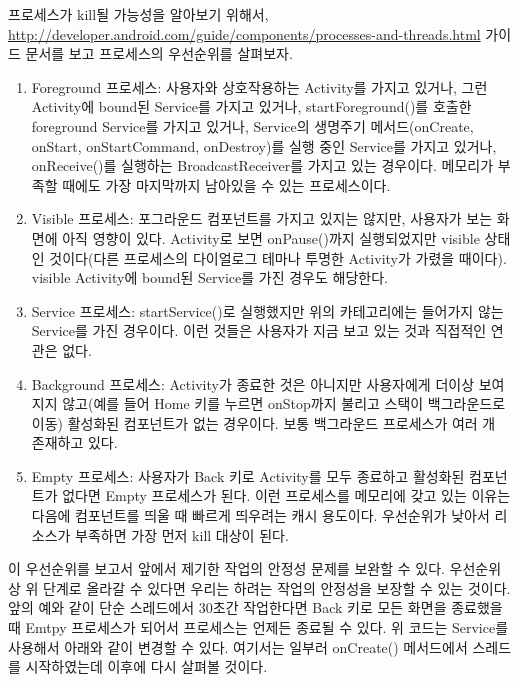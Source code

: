 프로세스가 kill될 가능성을 알아보기 위해서, 
\url{http://developer.android.com/guide/components/processes-and-threads.html} 가이드 문서를 보고 프로세스의 우선순위를 살펴보자.
\begin{enumerate}
\item Foreground 프로세스: 사용자와 상호작용하는 Activity를 가지고 있거나, 그런 Activity에 bound된 Service를 가지고 있거나, startForeground()를 호출한 foreground Service를 가지고 있거나, Service의 생명주기 메서드(onCreate, onStart, onStartCommand, onDestroy)를 실행 중인 Service를 가지고 있거나, onReceive()를 실행하는 BroadcastReceiver를 가지고 있는 경우이다.
메모리가 부족할 때에도 가장 마지막까지 남아있을 수 있는 프로세스이다.

\item Visible 프로세스: 포그라운드 컴포넌트를 가지고 있지는 않지만, 사용자가 보는 화면에 아직 영향이 있다. Activity로 보면 onPause()까지 실행되었지만 visible 상태인 것이다(다른 프로세스의 다이얼로그 테마나 투명한 Activity가 가렸을 때이다).
visible Activity에 bound된 Service를 가진 경우도 해당한다. 

\item Service 프로세스: startService()로 실행했지만 위의 카테고리에는 들어가지 않는 Service를 가진 경우이다. 이런 것들은 사용자가 지금 보고 있는 것과 직접적인 연관은 없다.

\item Background 프로세스: Activity가 종료한 것은 아니지만 사용자에게 더이상 보여지지 않고(예를 들어 Home 키를 누르면 onStop까지 불리고 스택이 백그라운드로 이동) 활성화된 컴포넌트가 없는 경우이다. 보통 백그라운드 프로세스가 여러 개 존재하고 있다.

\item Empty 프로세스: 사용자가 Back 키로 Activity를 모두 종료하고 활성화된 컴포넌트가 없다면 Empty 프로세스가 된다. 이런 프로세스를 메모리에 갖고 있는 이유는 다음에 컴포넌트를 띄울 때 빠르게 띄우려는 캐시 용도이다. 우선순위가 낮아서 리소스가 부족하면 가장 먼저 kill 대상이 된다.
\end{enumerate}

이 우선순위를 보고서 앞에서 제기한 작업의 안정성 문제를 보완할 수 있다. 우선순위상 위 단계로 올라갈 수 있다면 우리는 하려는 작업의 안정성을 보장할 수 있는 것이다. 
앞의 예와 같이 단순 스레드에서 30초간 작업한다면 Back 키로 모든 화면을 종료했을 때 Emtpy 프로세스가 되어서 프로세스는 언제든 종료될 수 있다.
위 코드는 Service를 사용해서 아래와 같이 변경할 수 있다. 여기서는 일부러 onCreate() 메서드에서 스레드를 시작하였는데 이후에 다시 살펴볼 것이다.

